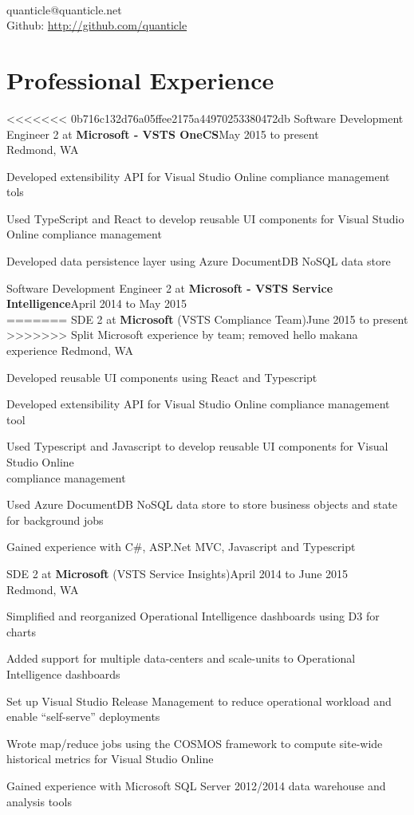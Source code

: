 \documentclass[letterpaper]{article}
\newenvironment{resume-list}
{\begin{itemize}
 \setlength{\itemsep}{0pt}
 \setlength{\parskip}{0pt}}
{\end{itemize}}
\begin{document}
\\
{\small quanticle@quanticle.net}\\
{\small Github: \url{http://github.com/quanticle}}\\
\section*{Professional Experience}
<<<<<<< 0b716c132d76a05ffee2175a44970253380472db
\noindent Software Development Engineer 2 at {\bfseries Microsoft - VSTS OneCS}\dotfill May 2015 to present\\
Redmond, WA
\begin{resume-list}
\item Developed extensibility API for Visual Studio Online compliance management tols
\item Used TypeScript and React to develop reusable UI components for Visual Studio Online compliance management
\item Developed data persistence layer using Azure DocumentDB NoSQL data store
\end{resume-list}
\noindent Software Development Engineer 2 at {\bfseries Microsoft - VSTS Service Intelligence}\dotfill April 2014 to May 2015\\
=======
\noindent SDE 2 at {\bfseries Microsoft} (VSTS Compliance Team)\dotfill June 2015 to present\\
>>>>>>> Split Microsoft experience by team; removed hello makana experience
Redmond, WA
\begin{resume-list}
\item Developed reusable UI components using React and Typescript
\item Developed extensibility API for Visual Studio Online compliance management tool
\item Used Typescript and Javascript to develop reusable UI components for Visual Studio Online\\
      compliance management
\item Used Azure DocumentDB NoSQL data store to store business objects and state for background jobs
\item Gained experience with C\#, ASP.Net MVC, Javascript and Typescript
\end{resume-list}
\noindent SDE 2 at {\bfseries Microsoft} (VSTS Service Insights)\dotfill April 2014 to June 2015\\
Redmond, WA
\begin{resume-list}
\item Simplified and reorganized Operational Intelligence dashboards using D3 for charts
\item Added support for multiple data-centers and scale-units to Operational Intelligence dashboards
\item Set up Visual Studio Release Management to reduce operational workload and enable ``self-serve'' deployments
\item Wrote map/reduce jobs using the COSMOS framework to compute site-wide historical metrics for Visual Studio Online
\item Gained experience with Microsoft SQL Server 2012/2014 data warehouse and analysis tools
\end{resume-list}
\end{document}
